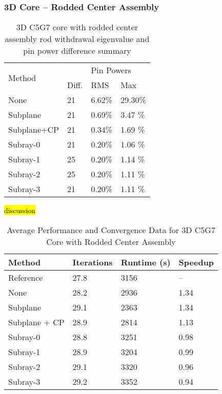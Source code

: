 \subsubsection{3D Core -- Rodded Center Assembly}

\begin{table}
    \centering
    \caption[3D C5G7 Core with Rodded Center Assembly Results]{3D C5G7 core with rodded center assembly rod withdrawal eigenvalue and pin power difference summary}\label{t:c5g7-3d-core-center}
    \begin{tabular}{l l l l}\toprule
        \multirow{2}{*}{Method} & \keff{} & \multicolumn{2}{l}{Pin Powers} \\
        & Diff. & RMS & Max \\\midrule
None        & 21 & 6.62\% & 29.30\% \\
Subplane    & 21 & 0.69\% & 3.47 \% \\
Subplane+CP & 21 & 0.34\% & 1.69 \% \\
Subray-0    & 21 & 0.20\% & 1.06 \% \\
Subray-1    & 25 & 0.20\% & 1.14 \% \\
Subray-2    & 25 & 0.20\% & 1.11 \% \\
Subray-3    & 21 & 0.20\% & 1.11 \% \\
        \bottomrule
    \end{tabular}
\end{table}

\hl{discussion}

\begin{table}[h]
    \centering
    \caption[3D C5G7 Core with Rodded Center Assembly Performance]{Average Performance and Convergence Data for 3D C5G7 Core with Rodded Center  Assembly}\label{t:subray-performance-3Dcore-center}
    \begin{tabular}{l l l l}\toprule
        Method & Iterations & Runtime (s) & Speedup \\\midrule
        Reference     & 27.8 & 3156 & -- \\
        None          & 28.2 & 2936 & 1.34 \\
        Subplane      & 29.1 & 2363 & 1.34 \\
        Subplane + CP & 28.9 & 2814 & 1.13 \\
        Subray-0      & 28.8 & 3251 & 0.98 \\
        Subray-1      & 28.9 & 3204 & 0.99 \\
        Subray-2      & 29.1 & 3320 & 0.96 \\
        Subray-3      & 29.2 & 3352 & 0.94 \\
        \bottomrule
    \end{tabular}
\end{table}


